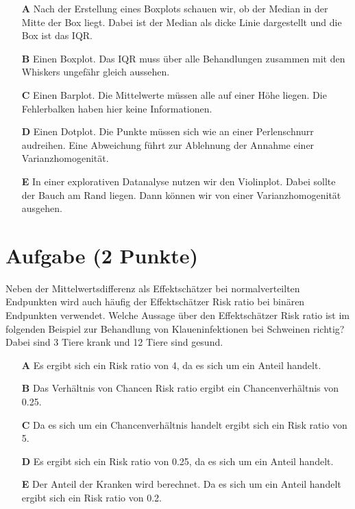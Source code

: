 \documentclass[a4paper, 9pt]{scrartcl}\usepackage[]{graphicx}\usepackage[]{xcolor}
\begin{document}
\begin{enumerate}
\item [\textbf{A} \msquare] Nach der Erstellung eines Boxplots schauen wir, ob der Median in der Mitte der Box liegt. Dabei ist der Median als dicke Linie dargestellt und die Box ist das IQR.
\item [\textbf{B} \msquare] Einen Boxplot. Das IQR muss über alle Behandlungen zusammen mit den Whiskers ungefähr gleich aussehen.
\item [\textbf{C} \msquare] Einen Barplot. Die Mittelwerte müssen alle auf einer Höhe liegen. Die Fehlerbalken haben hier keine Informationen.
\item [\textbf{D} \msquare] Einen Dotplot. Die Punkte müssen sich wie an einer Perlenschnurr audreihen. Eine Abweichung führt zur Ablehnung der Annahme einer Varianzhomogenität.
\item [\textbf{E} \msquare] In einer explorativen Datanalyse nutzen wir den Violinplot. Dabei sollte der Bauch am Rand liegen. Dann können wir von einer Varianzhomogenität ausgehen.
\end{enumerate} 

\section{Aufgabe \hfill (2 Punkte)}

\ifcollection
\begin{flushright}
\tiny\vspace{-2Ex}
\textbf{\examinhaltstart}
\exammodulebiostat
\vspace{-1Ex}
\end{flushright}
\fi




Neben der Mittelwertsdifferenz als Effektschätzer bei normalverteilten Endpunkten wird auch häufig der Effektschätzer Risk ratio bei binären Endpunkten verwendet. Welche Aussage über den Effektschätzer Risk ratio ist im folgenden Beispiel zur Behandlung von Klaueninfektionen bei Schweinen richtig? Dabei sind 3 Tiere krank und 12 Tiere sind gesund.



\begin{enumerate}
\item [\textbf{A} \msquare] Es ergibt sich ein Risk ratio von 4, da es sich um ein Anteil handelt.
\item [\textbf{B} \msquare] Das Verhältnis von Chancen Risk ratio ergibt ein Chancenverhältnis von 0.25.
\item [\textbf{C} \msquare] Da es sich um ein Chancenverhältnis handelt ergibt sich ein Risk ratio von 5.
\item [\textbf{D} \msquare] Es ergibt sich ein Risk ratio von 0.25, da es sich um ein Anteil handelt.
\item [\textbf{E} \msquare] Der Anteil der Kranken wird berechnet. Da es sich um ein Anteil handelt ergibt sich ein Risk ratio von 0.2.
\end{enumerate} 
\end{document}
